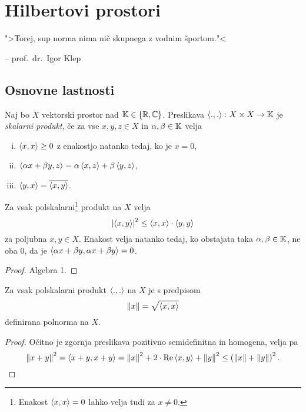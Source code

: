 \section{Hilbertovi prostori}

\epigraph{">Torej, sup norma nima nič skupnega z vodnim
športom."<}{-- prof.~dr.~Igor Klep}

\subsection{Osnovne lastnosti}

\begin{definicija}
Naj bo $X$ vektorski prostor nad $\mathbb{K} \in \left\{\mathbb{R}, \mathbb{C}\right\}$. Preslikava
$\left\langle .,.\right\rangle \colon X \times X \to \mathbb{K}$ je
\emph{skalarni produkt},
če za vse $x, y, z \in X$ in $\alpha, \beta \in \mathbb{K}$ velja

\begin{enumerate}[i)]
\item $\left\langle x,x\right\rangle \geq 0$ z enakostjo natanko tedaj, ko je $x = 0$,
\item
$\left\langle \alpha x + \beta y, z\right\rangle = \alpha \left\langle x,z\right\rangle + \beta \left\langle y,z\right\rangle$,
\item $\left\langle y,x\right\rangle = \overline{\left\langle x,y\right\rangle}$.
\end{enumerate}
\end{definicija}

\begin{izrek}
Za vsak polskalarni\footnote{Enakost $\left\langle x,x\right\rangle = 0$ lahko velja
tudi za $x \ne 0$.} produkt na $X$ velja
\[
\left\lvert \left\langle x,y\right\rangle\right\rvert^2 \leq \left\langle x,x\right\rangle \cdot \left\langle y,y\right\rangle
\]
za poljubna $x,y \in X$. Enakost velja natanko tedaj, ko obstajata
taka $\alpha, \beta \in \mathbb{K}$, ne oba $0$, da je
$\left\langle \alpha x + \beta y, \alpha x + \beta y\right\rangle = 0$.
\end{izrek}

\begin{proof}
Algebra 1.
\end{proof}

\begin{trditev}
Za vsak polskalarni produkt $\left\langle .,.\right\rangle$ na $X$ je s predpisom
\[
\left\lVert x\right\rVert = \sqrt{\left\langle x,x\right\rangle}
\]
definirana polnorma na $X$.
\end{trditev}

\begin{proof}
Očitno je zgornja preslikava pozitivno semidefinitna in homogena,
velja pa
\[
\left\lVert x+y\right\rVert^2 =
\left\langle x+y,x+y\right\rangle =
\left\lVert x\right\rVert^2 + 2 \cdot \operatorname{Re} \left\langle x,y\right\rangle + \left\lVert y\right\rVert^2 \leq
\left(\left\lVert x\right\rVert + \left\lVert y\right\rVert\right)^2. \qedhere
\]
\end{proof}

